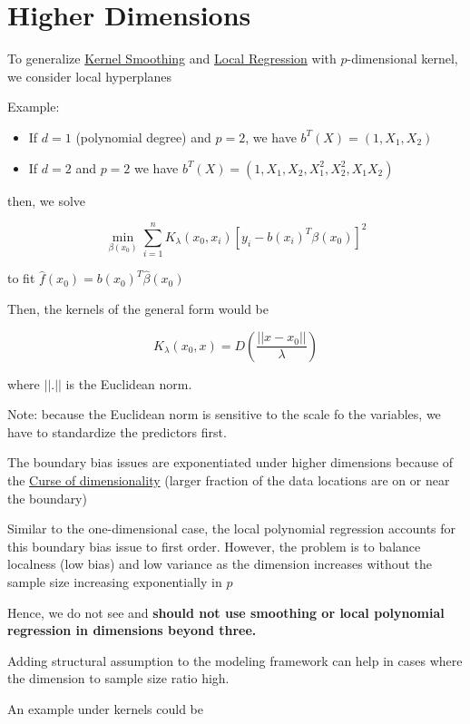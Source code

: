 \documentclass[
]{book}
\begin{document}
\hypertarget{higher-dimensions}{%
\section{Higher Dimensions}\label{higher-dimensions}}

To generalize \protect\hyperlink{kernel-smoothing}{Kernel Smoothing} and \protect\hyperlink{local-regression}{Local Regression} with \(p\)-dimensional kernel, we consider local hyperplanes

Example:

\begin{itemize}
\item
  If \(d= 1\) (polynomial degree) and \(p=2\), we have \(b^T(X) = (1,X_1,X_2)\)
\item
  If \(d =2\) and \(p=2\) we have \(b^T(X) = (1, X_1, X_2, X_1^2, X_2^2, X_1 X_2)\)
\end{itemize}

then, we solve

\[
\min_{\beta(x_0)} \sum_{i=1}^n K_\lambda(x_0,x_i)[y_i -b(x_i)^T \beta(x_0)]^2
\]

to fit \(\hat{f}(x_0) = b(x_0)^T \hat{\beta}(x_0)\)

Then, the kernels of the general form would be

\[
K_\lambda(x_0, x) = D(\frac{||x-x_0||}{\lambda})
\]

where \(||.||\) is the Euclidean norm.

Note: because the Euclidean norm is sensitive to the scale fo the variables, we have to standardize the predictors first.

The boundary bias issues are exponentiated under higher dimensions because of the \protect\hyperlink{curse-of-dimensionality}{Curse of dimensionality} (larger fraction of the data locations are on or near the boundary)

Similar to the one-dimensional case, the local polynomial regression accounts for this boundary bias issue to first order. However, the problem is to balance localness (low bias) and low variance as the dimension increases without the sample size increasing exponentially in \(p\)

Hence, we do not see and \textbf{should not use smoothing or local polynomial regression in dimensions beyond three.}

Adding structural assumption to the modeling framework can help in cases where the dimension to sample size ratio high.

An example under kernels could be
\end{document}
